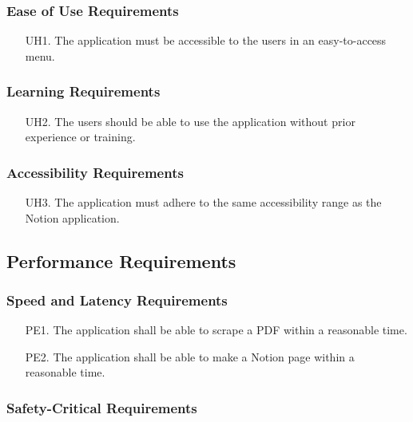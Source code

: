 \documentclass[12pt, titlepage]{article}
\begin{document}
\subsubsection{Ease of Use Requirements}

\begin{itemize}
  \item[UH1.] The application must be accessible to the users in an easy-to-access menu.
\end{itemize}

\subsubsection{ Learning Requirements}

\begin{itemize}
  \item[UH2.] The users should be able to use the application without prior experience or training.
\end{itemize}

\subsubsection{Accessibility Requirements}

\begin{itemize}
  \item[UH3.] The application must adhere to the same accessibility range as the Notion application. 
\end{itemize}

\subsection{Performance Requirements}

\subsubsection{Speed and Latency Requirements}

\begin{itemize}
  \item[PE1.] The application shall be able to scrape a PDF within a reasonable time. 
  \item[PE2.] The application shall be able to make a Notion page within a reasonable time. 
\end{itemize}

\subsubsection{ Safety-Critical Requirements}
\end{document}
